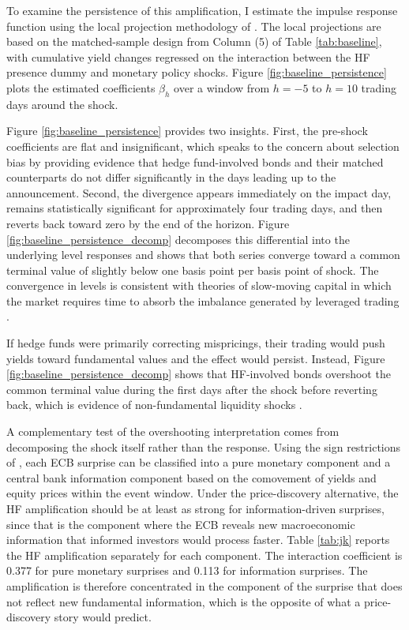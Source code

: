 \documentclass[english, 11pt, oneside]{article}
\begin{document}
To examine the persistence of this amplification, I estimate the impulse response function using the local projection methodology of \citet{jorda2005}. The local projections are based on the matched-sample design from Column (5) of Table \ref{tab:baseline}, with cumulative yield changes regressed on the interaction between the HF presence dummy and monetary policy shocks. Figure \ref{fig:baseline_persistence} plots the estimated coefficients $\beta_h$ over a window from $h=-5$ to $h=10$ trading days around the shock.

Figure \ref{fig:baseline_persistence} provides two insights. First, the pre-shock coefficients are flat and insignificant, which speaks to the concern about selection bias by providing evidence that hedge fund-involved bonds and their matched counterparts do not differ significantly in the days leading up to the announcement. Second, the divergence appears immediately on the impact day, remains statistically significant for approximately four trading days, and then reverts back toward zero by the end of the horizon. Figure \ref{fig:baseline_persistence_decomp} decomposes this differential into the underlying level responses and shows that both series converge toward a common terminal value of slightly below one basis point per basis point of shock. The convergence in levels is consistent with theories of slow-moving capital in which the market requires time to absorb the imbalance generated by leveraged trading \citep{duffie2010, mitchell2007}.

If hedge funds were primarily correcting mispricings, their trading would push yields toward fundamental values and the effect would persist. Instead, Figure \ref{fig:baseline_persistence_decomp} shows that HF-involved bonds overshoot the common terminal value during the first days after the shock before reverting back, which is evidence of non-fundamental liquidity shocks \citep{coval2007}.

A complementary test of the overshooting interpretation comes from decomposing the shock itself rather than the response. Using the sign restrictions of \citet{jarocinski2020}, each ECB surprise can be classified into a pure monetary component and a central bank information component based on the comovement of yields and equity prices within the event window. Under the price-discovery alternative, the HF amplification should be at least as strong for information-driven surprises, since that is the component where the ECB reveals new macroeconomic information that informed investors would process faster. Table \ref{tab:jk} reports the HF amplification separately for each component. The interaction coefficient is 0.377 for pure monetary surprises and 0.113 for information surprises. The amplification is therefore concentrated in the component of the surprise that does not reflect new fundamental information, which is the opposite of what a price-discovery story would predict.
\end{document}
